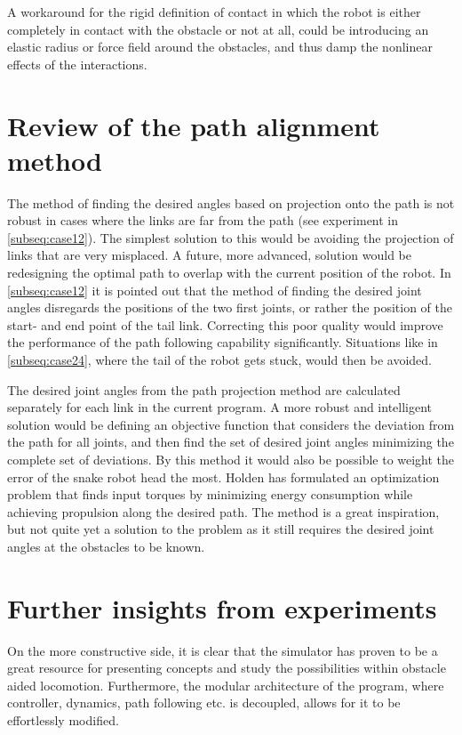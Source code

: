 A workaround for the rigid definition of contact in which the robot is either completely in contact with the obstacle or not at all, could be introducing an elastic radius or force field around the obstacles, and thus damp the nonlinear effects of the interactions. %


\section{Review of the path alignment method}\label{sec:pathdiscussion}

The method of finding the desired angles based on projection onto the path is not robust in cases where the links are far from the path (see experiment in \ref{subseq:case12}). The simplest solution to this would be avoiding the projection of links that are very misplaced. A future, more advanced, solution would be redesigning the optimal path to overlap with the current position of the robot. In \ref{subseq:case12} it is pointed out that the method of finding the desired joint angles disregards the positions of the two first joints, or rather the position of the start- and end point of the tail link. Correcting this poor quality would improve the performance of the path following capability significantly. Situations like in \ref{subseq:case24}, where the tail of the robot gets stuck, would then be avoided.

The desired joint angles from the path projection method are calculated separately for each link in the current program. A more robust and intelligent solution would be defining an objective function that considers the deviation from the path for all joints, and then find the set of desired joint angles minimizing the complete set of deviations. By this method it would also be possible to weight the error of the snake robot head the most. Holden \cite{holden2014optimal} has formulated an optimization problem that finds input torques by minimizing energy consumption while achieving propulsion along the desired path. The method is a great inspiration, but not quite yet a solution to the problem as it still requires the desired joint angles at the obstacles to be known.

\section{Further insights from experiments}

On the more constructive side, it is clear that the simulator has proven to be a great resource for presenting concepts and study the possibilities within obstacle aided locomotion. Furthermore, the modular architecture of the program, where controller, dynamics, path following etc. is decoupled, allows for it to be effortlessly modified.

